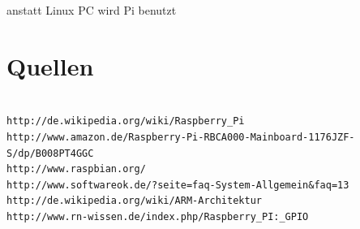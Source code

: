 \documentclass[12pt]{article}
\begin{document}
anstatt Linux PC wird Pi benutzt

\section{Quellen}
\begin{verbatim}

http://de.wikipedia.org/wiki/Raspberry_Pi
http://www.amazon.de/Raspberry-Pi-RBCA000-Mainboard-1176JZF-S/dp/B008PT4GGC
http://www.raspbian.org/
http://www.softwareok.de/?seite=faq-System-Allgemein&faq=13
http://de.wikipedia.org/wiki/ARM-Architektur
http://www.rn-wissen.de/index.php/Raspberry_PI:_GPIO

\end{verbatim}
\end{document}
